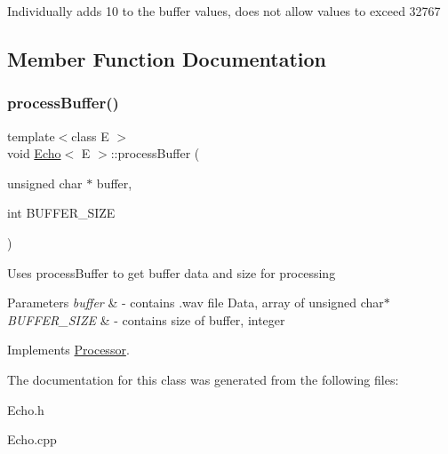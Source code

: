 Individually adds 10 to the buffer values, does not allow values to exceed 32767 

\subsection{Member Function Documentation}
\mbox{\label{classEcho_a3e23a70d522b79ef1e5b9df90c2af183}} 
\subsubsection{\texorpdfstring{process\+Buffer()}{processBuffer()}}
{\footnotesize\ttfamily template$<$class E $>$ \\
void \hyperlink{classEcho}{Echo}$<$ E $>$\+::process\+Buffer (\begin{DoxyParamCaption}\item[{unsigned char $\ast$}]{buffer,  }\item[{int}]{B\+U\+F\+F\+E\+R\+\_\+\+S\+I\+ZE }\end{DoxyParamCaption})\hspace{0.3cm}{\ttfamily [virtual]}}

Uses process\+Buffer to get buffer data and size for processing 
\begin{DoxyParams}{Parameters}
{\em buffer} & -\/ contains .wav file Data, array of unsigned char$\ast$ \\
\hline
{\em B\+U\+F\+F\+E\+R\+\_\+\+S\+I\+ZE} & -\/ contains size of buffer, integer \\
\hline
\end{DoxyParams}


Implements \hyperlink{classProcessor_a13e6240144c7a530079b0e2ae4a4526d}{Processor}.



The documentation for this class was generated from the following files\+:\begin{DoxyCompactItemize}
\item 
Echo.\+h\item 
Echo.\+cpp\end{DoxyCompactItemize}
